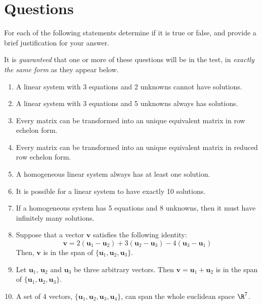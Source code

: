 \documentclass[12pt]{article}
\begin{document}
\section{Questions}
For each of the following statements determine if it is true or false, and provide a brief justification for your answer.

It is \emph{guaranteed} that one or more of these questions will be in the test, in \emph{exactly the same form} as they appear below.


\begin{enumerate}

\item A linear system with 3 equations and 2 unknowns cannot have solutions.

\item A linear system with 3 equations and 5 unknowns always has solutions.

\item Every matrix can be transformed into an unique equivalent matrix in row echelon form.

\item Every matrix can be transformed into an unique equivalent matrix in reduced row echelon form.


\item A homogeneous linear system always has at least one solution.

\item It is possible for a linear system to have exactly 10 solutions.

\item If a homogeneous system has 5 equations and 8 unknowns, then it must have infinitely many solutions.

\item Suppose that a vector $\mathbf{v}$ satisfies the following identity:
\[
\mathbf{v} = 2(\mathbf{u}_1-\mathbf{u}_2) + 3(\mathbf{u}_2-\mathbf{u}_3) - 4(\mathbf{u}_3-\mathbf{u}_1)
\]
Then, $\mathbf{v}$ is in the span of $\{\mathbf{u}_1,\mathbf{u}_2,\mathbf{u}_3\}$.


\item Let $\mathbf{u}_1$, $\mathbf{u}_2$ and $\mathbf{u}_3$ be three arbitrary vectors. Then $\mathbf{v}=\mathbf{u}_1+\mathbf{u}_2$ is in the span of $\{\mathbf{u}_1, \mathbf{u}_2, \mathbf{u}_3\}$. 

\item A set of 4 vectors, $\{\mathbf{u}_1, \mathbf{u}_2, \mathbf{u}_3, \mathbf{u}_4\}$, can span the whole euclidean space $\R^7$.


\end{enumerate}
\end{document}
